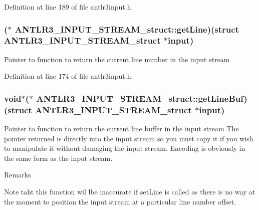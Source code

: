Definition at line 189 of file antlr3input.\-h.

\hypertarget{struct_a_n_t_l_r3___i_n_p_u_t___s_t_r_e_a_m__struct_a9bf0bff9acd4e32f08c8f57938d062aa}{
\subsubsection[{get\-Line}]{($\ast$ A\-N\-T\-L\-R3\-\_\-\-I\-N\-P\-U\-T\-\_\-\-S\-T\-R\-E\-A\-M\-\_\-struct\-::get\-Line)(struct {\bf A\-N\-T\-L\-R3\-\_\-\-I\-N\-P\-U\-T\-\_\-\-S\-T\-R\-E\-A\-M\-\_\-struct} $\ast$input)}}\label{struct_a_n_t_l_r3___i_n_p_u_t___s_t_r_e_a_m__struct_a9bf0bff9acd4e32f08c8f57938d062aa}
Pointer to function to return the current line number in the input stream 

Definition at line 174 of file antlr3input.\-h.

\hypertarget{struct_a_n_t_l_r3___i_n_p_u_t___s_t_r_e_a_m__struct_ac54c9d30cefd8256ea68d2d044ec4395}{
\subsubsection[{get\-Line\-Buf}]{\setlength{\rightskip}{0pt plus 5cm}void$\ast$($\ast$ A\-N\-T\-L\-R3\-\_\-\-I\-N\-P\-U\-T\-\_\-\-S\-T\-R\-E\-A\-M\-\_\-struct\-::get\-Line\-Buf)(struct {\bf A\-N\-T\-L\-R3\-\_\-\-I\-N\-P\-U\-T\-\_\-\-S\-T\-R\-E\-A\-M\-\_\-struct} $\ast$input)}}\label{struct_a_n_t_l_r3___i_n_p_u_t___s_t_r_e_a_m__struct_ac54c9d30cefd8256ea68d2d044ec4395}
Pointer to function to return the current line buffer in the input stream The pointer returned is directly into the input stream so you must copy it if you wish to manipulate it without damaging the input stream. Encoding is obviously in the same form as the input stream. \begin{DoxyRemark}{Remarks}

\begin{DoxyItemize}
\item Note taht this function wil lbe inaccurate if set\-Line is called as there is no way at the moment to position the input stream at a particular line number offset. 
\end{DoxyItemize}
\end{DoxyRemark}


